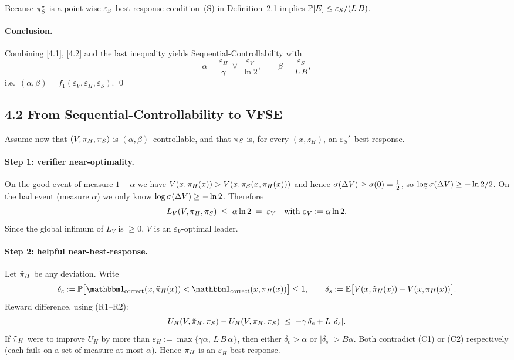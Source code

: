 Because $\pi_S^\star$ is a point-wise $\varepsilon_S$–best response
condition~(S) in Definition~2.1 implies
$\mathbb P[E]\le\varepsilon_S/(L\,B)$.

\paragraph{Conclusion.}
Combining \eqref{4.1}, \eqref{4.2} and the last inequality yields
Sequential-Controllability with
\[
\alpha
=\frac{\varepsilon_H}{\gamma}\ \vee\ \frac{\varepsilon_V}{\ln 2},
\qquad
\beta
=\frac{\varepsilon_S}{L\,B},
\]
i.e.\ $(\alpha,\beta)=f_1(\varepsilon_V,\varepsilon_H,\varepsilon_S)$.
\qed

\subsection*{4.2 \; From Sequential-Controllability to VFSE}

Assume now that $(V,\pi_H,\pi_S)$ is $(\alpha,\beta)$–controllable, and that
$\pi_S$ is, for every $(x,z_H)$, an $\varepsilon_S'$–best response.

\paragraph{Step 1: verifier near-optimality.}
On the good event of measure $1-\alpha$ we have
$V(x,\pi_H(x))>V(x,\pi_S(x,\pi_H(x)))$ and hence
$\sigma(\Delta V)\ge \sigma(0)=\tfrac12$,
so $\log\sigma(\Delta V)\ge-\ln 2/2$.
On the bad event (measure $\alpha$) we
only know $\log\sigma(\Delta V)\ge-\ln 2$.
Therefore
\[
L_V(V,\pi_H,\pi_S)
\;\le\;
\alpha\ln 2
\;=\;\varepsilon_V
\quad\text{with }\varepsilon_V:=\alpha\ln 2.
\]
Since the global infimum of $L_V$ is $\ge 0$,
$V$ is an $\varepsilon_V$-optimal leader.

\paragraph{Step 2: helpful near-best-response.}
Let $\tilde{\pi}_H$ be any deviation.
Write
\[
\delta_c
:=\PP\bigl[\corr(x,\dHt(x))<\corr(x,\dH(x))\bigr]\le 1,
\qquad
\delta_s
:=\EE\bigl[V(x,\dHt(x))-V(x,\dH(x))\bigr].
\]
Reward difference, using (R1–R2):
\[
U_H(V,\tilde{\pi}_H,\pi_S)-U_H(V,\pi_H,\pi_S)
\;\le\;
-\gamma\,\delta_c + L\,|\delta_s|.
\]
If $\tilde{\pi}_H$ were to improve $U_H$ by more than
$\varepsilon_H:=\max\{\gamma\alpha,\,L\,B\,\alpha\}$,
then either $\delta_c>\alpha$ or $|\delta_s|>B\alpha$.
Both contradict (C1) or (C2) respectively (each fails on a set of
measure at most $\alpha$).
Hence $\pi_H$ is an $\varepsilon_H$-best response.

